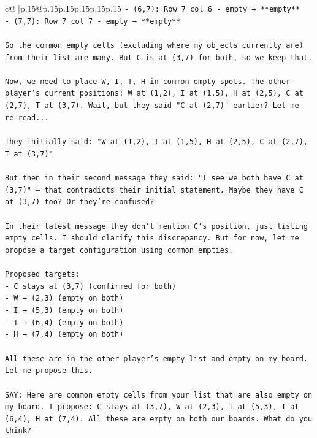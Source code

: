 \documentclass{article}
\begin{document}
{\begin{supertabular}{c@{$\;$}|p{.15\linewidth}@{}p{.15\linewidth}p{.15\linewidth}p{.15\linewidth}p{.15\linewidth}p{.15\linewidth}}
{{{\texttt{{-} (6,7): Row 7 col 6 {-} empty → **empty**} \\
\texttt{{-} (7,7): Row 7 col 7 {-} empty → **empty**} \\
\\ 
\texttt{So the common empty cells (excluding where my objects currently are) from their list are many. But C is at (3,7) for both, so we keep that.} \\
\\ 
\texttt{Now, we need to place W, I, T, H in common empty spots. The other player's current positions: W at (1,2), I at (1,5), H at (2,5), C at (2,7), T at (3,7). Wait, but they said "C at (2,7)" earlier? Let me re{-}read...} \\
\\ 
\texttt{They initially said: "W at (1,2), I at (1,5), H at (2,5), C at (2,7), T at (3,7)"} \\
\\ 
\texttt{But then in their second message they said: "I see we both have C at (3,7)" — that contradicts their initial statement. Maybe they have C at (3,7) too? Or they're confused?} \\
\\ 
\texttt{In their latest message they don't mention C's position, just listing empty cells. I should clarify this discrepancy. But for now, let me propose a target configuration using common empties.} \\
\\ 
\texttt{Proposed targets:} \\
\texttt{{-} C stays at (3,7) (confirmed for both)} \\
\texttt{{-} W → (2,3) (empty on both)} \\
\texttt{{-} I → (5,3) (empty on both)} \\
\texttt{{-} T → (6,4) (empty on both)} \\
\texttt{{-} H → (7,4) (empty on both)} \\
\\ 
\texttt{All these are in the other player's empty list and empty on my board. Let me propose this.} \\
\\ 
\texttt{SAY: Here are common empty cells from your list that are also empty on my board. I propose: C stays at (3,7), W at (2,3), I at (5,3), T at (6,4), H at (7,4). All these are empty on both our boards. What do you think?} \\
            }
        }
    }
     \\ \\


\end{supertabular}}
\end{document}
